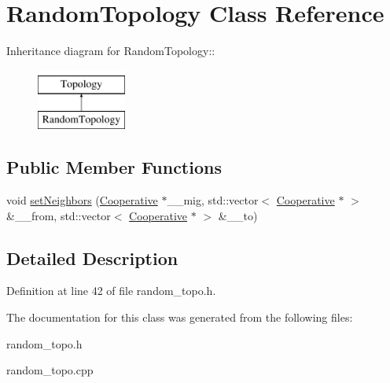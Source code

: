 \hypertarget{classRandomTopology}{
\section{Random\-Topology Class Reference}
\label{classRandomTopology}
}
Inheritance diagram for Random\-Topology::\begin{figure}[H]
\begin{center}
\leavevmode
\includegraphics[height=2cm]{classRandomTopology}
\end{center}
\end{figure}
\subsection*{Public Member Functions}
\begin{CompactItemize}
\item 
\hypertarget{classRandomTopology_f68ae9feb34a8e654ab4181153803ed1}{
void \hyperlink{classRandomTopology_f68ae9feb34a8e654ab4181153803ed1}{set\-Neighbors} (\hyperlink{classCooperative}{Cooperative} $\ast$\_\-\_\-mig, std::vector$<$ \hyperlink{classCooperative}{Cooperative} $\ast$ $>$ \&\_\-\_\-from, std::vector$<$ \hyperlink{classCooperative}{Cooperative} $\ast$ $>$ \&\_\-\_\-to)}
\label{classRandomTopology_f68ae9feb34a8e654ab4181153803ed1}

\end{CompactItemize}


\subsection{Detailed Description}




Definition at line 42 of file random\_\-topo.h.

The documentation for this class was generated from the following files:\begin{CompactItemize}
\item 
random\_\-topo.h\item 
random\_\-topo.cpp\end{CompactItemize}
